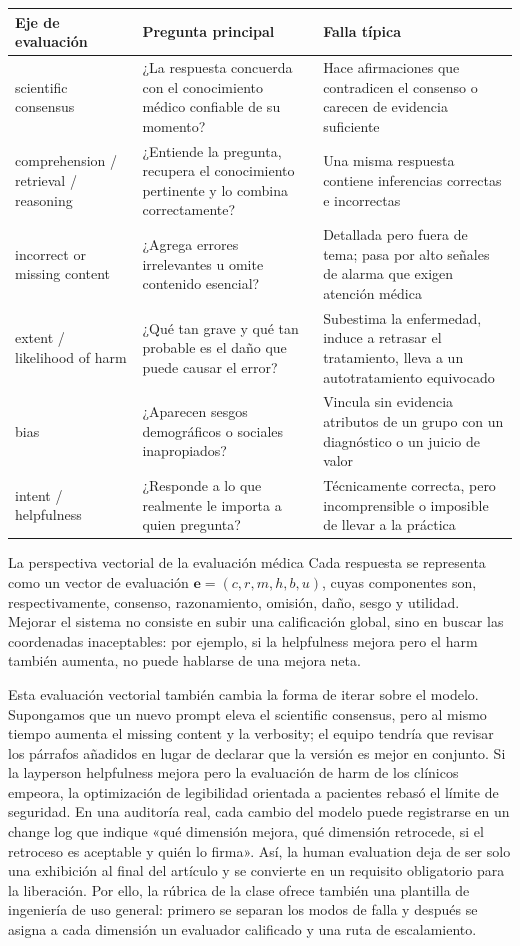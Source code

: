 \begin{longtable}{@{}L{0.22\textwidth}L{0.32\textwidth}L{0.34\textwidth}@{}}
\toprule
Eje de evaluación & Pregunta principal & Falla típica \\
\midrule
scientific consensus & ¿La respuesta concuerda con el conocimiento médico confiable de su momento? & Hace afirmaciones que contradicen el consenso o carecen de evidencia suficiente \\
comprehension / retrieval / reasoning & ¿Entiende la pregunta, recupera el conocimiento pertinente y lo combina correctamente? & Una misma respuesta contiene inferencias correctas e incorrectas \\
incorrect or missing content & ¿Agrega errores irrelevantes u omite contenido esencial? & Detallada pero fuera de tema; pasa por alto señales de alarma que exigen atención médica \\
extent / likelihood of harm & ¿Qué tan grave y qué tan probable es el daño que puede causar el error? & Subestima la enfermedad, induce a retrasar el tratamiento, lleva a un autotratamiento equivocado \\
bias & ¿Aparecen sesgos demográficos o sociales inapropiados? & Vincula sin evidencia atributos de un grupo con un diagnóstico o un juicio de valor \\
intent / helpfulness & ¿Responde a lo que realmente le importa a quien pregunta? & Técnicamente correcta, pero incomprensible o imposible de llevar a la práctica \\
\bottomrule
\end{longtable}

\begin{importantbox}{La perspectiva vectorial de la evaluación médica}
Cada respuesta se representa como un vector de evaluación $\mathbf{e}=(c,r,m,h,b,u)$, cuyas componentes son, respectivamente, consenso, razonamiento, omisión, daño, sesgo y utilidad. Mejorar el sistema no consiste en subir una calificación global, sino en buscar las coordenadas inaceptables: por ejemplo, si la helpfulness mejora pero el harm también aumenta, no puede hablarse de una mejora neta.
\end{importantbox}

Esta evaluación vectorial también cambia la forma de iterar sobre el modelo. Supongamos que un nuevo prompt eleva el scientific consensus, pero al mismo tiempo aumenta el missing content y la verbosity; el equipo tendría que revisar los párrafos añadidos en lugar de declarar que la versión es mejor en conjunto. Si la layperson helpfulness mejora pero la evaluación de harm de los clínicos empeora, la optimización de legibilidad orientada a pacientes rebasó el límite de seguridad. En una auditoría real, cada cambio del modelo puede registrarse en un change log que indique «qué dimensión mejora, qué dimensión retrocede, si el retroceso es aceptable y quién lo firma». Así, la human evaluation deja de ser solo una exhibición al final del artículo y se convierte en un requisito obligatorio para la liberación. Por ello, la rúbrica de la clase ofrece también una plantilla de ingeniería de uso general: primero se separan los modos de falla y después se asigna a cada dimensión un evaluador calificado y una ruta de escalamiento.

